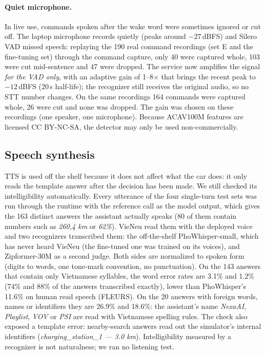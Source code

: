 \paragraph{Quiet microphone.} In live use, commands spoken after the wake word were sometimes ignored or cut off. The laptop
microphone records quietly (peaks around $-27$\,dBFS) and Silero VAD missed speech: replaying the 190 real command
recordings (set E and the fine-tuning set) through the command capture, only 40 were captured whole, 103 were cut
mid-sentence and 47 were dropped. The service now amplifies the signal \emph{for the VAD only}, with an adaptive gain of
1--8$\times$ that brings the recent peak to $-12$\,dBFS (20\,s half-life); the recognizer still receives the original audio, so
no STT number changes. On the same recordings 164 commands were captured whole, 26 were cut and none was dropped. The gain was
chosen on these recordings (one speaker, one microphone). Because ACAV100M features are
licensed CC BY-NC-SA, the detector may only be used non-commercially.

\subsection{Speech synthesis}
\label{sec:tts}

TTS is used off the shelf because it does not affect what the car does: it only reads the template answer after the decision
has been made. We still checked its intelligibility automatically. Every utterance of the four single-turn test sets was run
through the runtime with the reference call as the model output, which gives the 163 distinct answers the assistant actually
speaks (80 of them contain numbers such as \textit{260,4 km} or \textit{62\%}). VieNeu read them with the deployed voice and two
recognizers transcribed them: the off-the-shelf PhoWhisper-small, which has never heard VieNeu (the fine-tuned one was trained
on its voices), and Zipformer-30M as a second judge. Both sides are normalized to spoken form (digits to words, one tone-mark
convention, no punctuation). On the 143 answers that contain only Vietnamese syllables, the word error rates are 3.1\% and
1.2\% (74\% and 88\% of the answers transcribed exactly), lower than PhoWhisper's 11.6\% on human read speech (FLEURS). On the
20 answers with foreign words, names or identifiers they are 26.9\% and 18.6\%: the assistant's name \textit{NexaAI},
\textit{Playlist}, \textit{VOV} or \textit{PSI} are read with Vietnamese spelling rules. The check also exposed a template
error: nearby-search answers read out the simulator's internal identifiers (\textit{charging\_station\_1 --- 3.0 km}).
Intelligibility measured by a recognizer is not naturalness; we ran no listening test.

